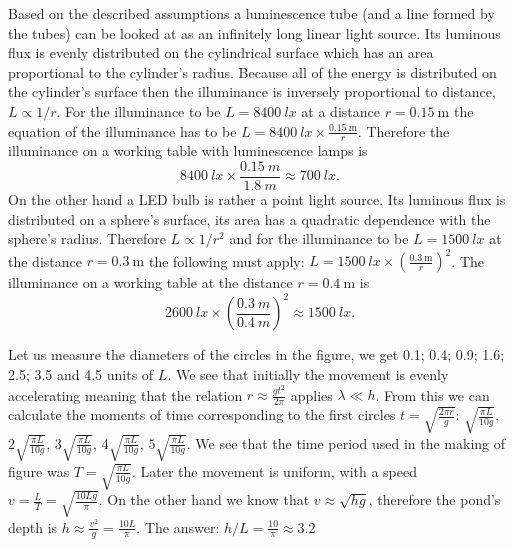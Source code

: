 \documentclass[11pt]{article}
\begin{document}
\solueng
Based on the described assumptions a luminescence tube (and a line formed by the tubes) can be looked at as an infinitely long linear light source. Its luminous flux is evenly distributed on the cylindrical surface which has an area proportional to the cylinder’s radius. Because all of the energy is distributed on the cylinder’s surface then the illuminance is inversely proportional to distance, $L \propto 1/r$. For the illuminance to be $L=\SI{8400}{lx}$ at a distance $r=\SI{0.15}{\meter}$ the equation of the illuminance has to be $L=\SI{8400}{lx}\times \frac{\SI{0.15}{\meter}} r$. Therefore the illuminance on a working table with luminescence lamps is 
\[
\SI{8400}{lx}\times\frac{\SI{0.15}{m}}{\SI{1.8}{m}}\approx\SI{700}{lx}.
\]
On the other hand a LED bulb is rather a point light source. Its luminous flux is distributed on a sphere’s surface, its area has a quadratic dependence with the sphere’s radius. Therefore $L \propto 1/r^2$ and for the illuminance to be $L=\SI{1500}{lx}$ at the distance $r=\SI{0.3}{\meter}$ the following must apply: $L=\SI{1500}{lx}\times \left(\frac{\SI{0.3}{\meter}} {r}\right)^2$. The illuminance on a working table at the distance $r=\SI{0.4}{\meter}$ is
\[
\SI{2600}{lx}\times\left(\frac{\SI{0.3}{m}}{\SI{0.4}{m}}\right)^2\approx\SI{1500}{lx}.
\]
\probend
\bigskip


\solueng
Let us measure the diameters of the circles in the figure, we get 0.1; 0.4; 0.9; 1.6; 2.5; 3.5 and 4.5 units of $L$. We see that initially the movement is evenly accelerating meaning that the relation $r \approx \frac{gt^2}{2 \pi}$ applies $\lambda \ll h$. From this we can calculate the moments of time corresponding to the first circles $t = \sqrt{\frac{2 \pi r}{g}}$: $\sqrt{\frac{\pi L}{10 g}}$, $2 \sqrt{\frac{\pi L}{10 g}}$, $3 \sqrt{\frac{\pi L}{10 g}}$, $4 \sqrt{\frac{\pi L}{10 g}}$, $5 \sqrt{\frac{\pi L}{10 g}}$. We see that the time period used in the making of figure was $T=\sqrt{\frac{\pi L}{10 g}}$. Later the movement is uniform, with a speed $v=\frac{L}{T}=\sqrt{\frac{10 L g}{\pi}}$. On the other hand we know that $v \approx \sqrt{hg}$, therefore the pond's depth is $h \approx \frac{v^2}{g} = \frac{10 L}{\pi}$. The answer: $h/L = \frac{10}{\pi} \approx \SI{3,2}{}$
\probend
\bigskip

\end{document}
